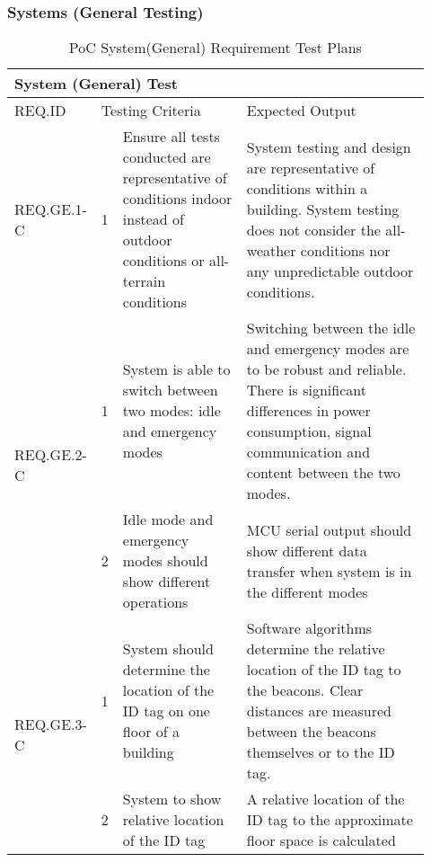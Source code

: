 \subsubsection{Systems (General Testing)}

\begin{table}[h!]
    \centering
    
    \begin{tabular}{|m{0.15\linewidth}|m{0.02\linewidth}|m{0.3\linewidth}|m{0.45\linewidth}|} 
    \hline
    \multicolumn{4}{|l|}{System (General) Test}  \\ 
    \hline
    REQ.ID & \multicolumn{2}{l|}{Testing Criteria} & Expected Output \\ 
    \hline
    REQ.GE.1-C                  
    & 1
    & Ensure all tests conducted are representative of conditions indoor instead of outdoor conditions or all-terrain conditions 
    & System testing and design are representative of conditions within a building. 
    System testing does not consider the all-weather conditions nor any unpredictable outdoor conditions.\\ 
    \hline

    \multirow{2}{*}{REQ.GE.2-C} 
    & 1 
    & System is able to switch between two modes: idle and emergency modes       
    & Switching between the idle and emergency modes are to be robust and reliable. 
    There is significant differences in power consumption, signal communication and content between the two modes. \\ 
    \cline{2-4}
    & 2 
    & Idle mode and emergency modes should show different operations 
    & MCU serial output should show different data transfer when system is in the different modes \\ 
    \hline

    \multirow{2}{*}{REQ.GE.3-C} 
    & 1 
    & System should determine the location of the ID tag on one floor of a building     
    & Software algorithms determine the relative location of the ID tag to the beacons. 
    Clear distances are measured between the beacons themselves or to the ID tag.~\\ 
    \cline{2-4}
    & 2 
    & System to show relative location of the ID tag     
    & A relative location of the ID tag to the approximate floor space is calculated \\
    \hline
    \end{tabular}
    \caption{PoC System(General) Requirement Test Plans}
\end{table}

